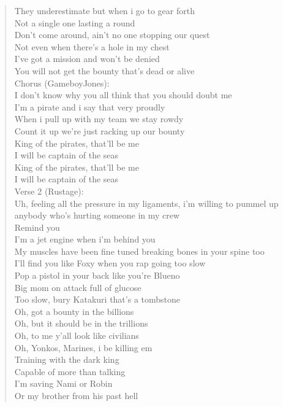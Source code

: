 \documentclass[11pt]{article}
\begin{document}
\begin{verse}
They underestimate but when i go to gear forth\\
Not a single one lasting a round\\
Don't come around, ain’t no one stopping our quest\\
Not even when there's a hole in my chest\\
I've got a mission and won't be denied\\
You will not get the bounty that’s dead or alive\\
Chorus (GameboyJones):\\
I don't know why you all think that you should doubt me\\
I'm a pirate and i say that very proudly\\
When i pull up with my team we stay rowdy\\
Count it up we're just racking up our bounty\\
King of the pirates, that'll be me\\
I will be captain of the seas\\
King of the pirates, that'll be me\\
I will be captain of the seas\\
\vspace*{1em}
Verse 2 (Rustage):\\
Uh, feeling all the pressure in my ligaments, i'm willing to pummel up anybody who's hurting someone in my crew\\
Remind you\\
I'm a jet engine when i'm behind you\\
My muscles have been fine tuned breaking bones in your spine too\\
I'll find you like Foxy when you rap going too slow\\
Pop a pistol in your back like you're Blueno\\
Big mom on attack full of glucose\\
Too slow, bury Katakuri that's a tombstone\\
Oh, got a bounty in the billions\\
Oh, but it should be in the trillions\\
Oh, to me y'all look like civilians\\
Oh, Yonkos, Marines, i be killing em\\
Training with the dark king\\
Capable of more than talking\\
I'm saving Nami or Robin\\
Or my brother from his past hell\\

\end{verse}
\end{document}
